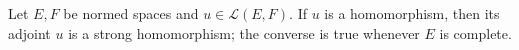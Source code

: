 Let $E, F$ be normed spaces and $u \in \mathcal{L}(E, F)$. If $u$ is a homomorphism, then its adjoint $u$ is a strong homomorphism; the converse is true whenever $E$ is complete.